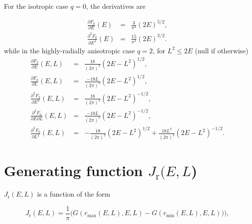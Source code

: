 \documentclass[11pt]{article}
\newcommand{\rr}{\mathrm{r}}
\newcommand{\Jr}{J_{\rr}}
\newcommand{\rmax}{r_{\max}}
\newcommand{\rmin}{r_{\min}}
\begin{document}
\begin{appendices}
For the isotropic case $q=0$, the derivatives are

\begin{equation}
  \begin{array}{ccl}
    \displaystyle{\frac{\partial F_{0}}{\partial E}(E)}&=&\displaystyle{\frac{3}{\pi^{3}}(2E)^{5/2}} ,\\

    \displaystyle{\frac{\partial^{2} F_{0}}{\partial E^{2}}(E)} &=& \displaystyle{\frac{15}{\pi^{3}}(2E)^{3/2}} .
    \end{array}
\label{eq:dF0}
\end{equation}
while in the highly-radially anisotropic case $q=2$, for $L^{2} \leq 2E$ (null if otherwise)
\begin{equation}
  \begin{array}{ccl}
    \displaystyle{\frac{\partial F_{2}}{\partial E}(E,L)}&=&\displaystyle{\frac{18}{(2\pi)^{3}}(2E-L^{2})^{1/2}} ,\\

    \displaystyle{\frac{\partial F_{0}}{\partial L}(E,L)} &=& \displaystyle{\frac{-18L}{(2\pi)^{3}}(2E-L^{2})^{1/2}} , \\
  
      \displaystyle{\frac{\partial^{2} F_{2}}{\partial E^{2}}(E,L)}&=&\displaystyle{\frac{18}{(2\pi)^{3}}(2E-L^{2})^{-1/2}} ,\\

      \displaystyle{\frac{\partial^{2} F_{0}}{\partial E \partial L}(E,L)} &=& \displaystyle{\frac{-18L}{(2\pi)^{3}}(2E-L^{2})^{-1/2}} , \\

         \displaystyle{\frac{\partial^{2} F_{0}}{\partial L^{2}}(E,L)} &=& \displaystyle{-\frac{18}{(2\pi)^{3}}(2E-L^{2})^{1/2}+\frac{18L^{2}}{(2\pi)^{3}}(2E-L^{2})^{-1/2}} .
    \end{array}
\label{eq:dF2}
\end{equation}

\section{Generating function $\Jr(E,L$)}
\label{sec:derivatives_Jr}

$\Jr(E,L)$ is a function of the form

\begin{equation}
  \Jr(E,L) = \frac{1}{\pi} \bigg(G(\rmax(E,L),E,L)-G(\rmin(E,L),E,L))\bigg)
  \label{eq:Jr_eq} ,
\end{equation}


\end{appendices}
\end{document}
